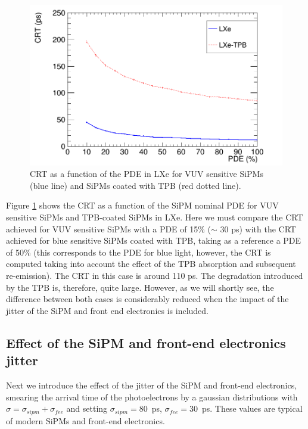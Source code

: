 \documentclass[review]{elsarticle}
\begin{document}
\begin{figure}[!bhtp]
	\centering
	\includegraphics[scale=0.4]{../img/CRTvsPDELXeTPBNoJitter.png}
	\caption{\label{fig.crt2} CRT as a function of the PDE in LXe for VUV sensitive SiPMs (blue line) and SiPMs coated with TPB (red dotted line). }
\end{figure}

Figure \ref{fig.crt2} shows the CRT as a function of the
 SiPM nominal PDE for VUV sensitive SiPMs and TPB-coated SiPMs in LXe. Here we must compare the CRT achieved for VUV sensitive SiPMs with a PDE of 15\% ($\sim$ 30 ps) with the CRT achieved for blue sensitive SiPMs coated with TPB, taking as a reference a PDE of 50\% (this corresponds to the
 PDE for blue light,  however, the CRT is computed taking into account the effect of the TPB absorption and subsequent re-emission).  The CRT in this case is around 110 ps. The degradation introduced by the TPB is, therefore, quite large. However, as we will shortly see, the difference between both cases  is
 considerably reduced when the impact of the jitter of the SiPM and front end electronics is included. 
  
\subsection*{Effect of the SiPM  and front-end electronics jitter}
  Next we introduce the effect of the jitter of the SiPM and front-end electronics, smearing the arrival time of the photoelectrons by a gaussian distributions with $\sigma = \sigma_{sipm} +  \sigma_{fee}$ and setting 
 $\sigma_{sipm} = 80$~ps, $\sigma_{fee} = 30$~ps. These values are typical of modern SiPMs and front-end electronics. 
 
\end{document}
